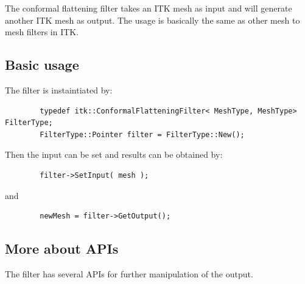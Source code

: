 \documentclass{InsightArticle}
\begin{document}
	The conformal flattening filter takes an ITK mesh as input and will
	generate another ITK mesh as output. The usage is basically the same
	as other mesh to mesh filters in ITK.

	\subsection{Basic usage}
	The filter is instaintiated by:
	\begin{verbatim}
		typedef itk::ConformalFlatteningFilter< MeshType, MeshType>  FilterType;
		FilterType::Pointer filter = FilterType::New();
	\end{verbatim}
	Then the input can be set and results can be obtained by:
	\begin{verbatim}
		filter->SetInput( mesh ); 
	\end{verbatim}
	and
	\begin{verbatim}
		newMesh = filter->GetOutput(); 
	\end{verbatim}

	\subsection{More about APIs}
	The filter has several APIs for further manipulation of the output.
	
\end{document}
